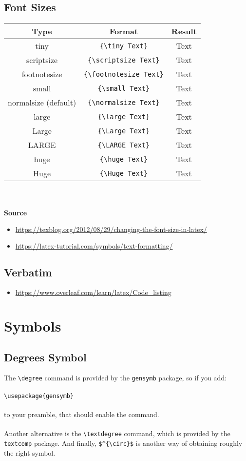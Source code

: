 \documentclass[10pt, letterpaper]{article}
\begin{document}
\subsection{Font Sizes}
\begin{tabular}{c c c}
    Type & Format & Result\\
    \hline
    tiny & \verb|{\tiny Text}| & {\tiny Text}\\
    scriptsize & \verb|{\scriptsize Text}| & {\scriptsize Text}\\
    footnotesize & \verb|{\footnotesize Text}| & {\footnotesize Text}\\
    small & \verb|{\small Text}| & {\small Text}\\
    normalsize (default) & \verb|{\normalsize Text}| & {\normalsize Text}\\
    large & \verb|{\large Text}| & {\large Text}\\
    Large & \verb|{\Large Text}| & {\Large Text}\\
    LARGE & \verb|{\LARGE Text}| & {\LARGE Text}\\
    huge & \verb|{\huge Text}| & {\huge Text}\\
    Huge & \verb|{\Huge Text}| & {\Huge Text}\\
\end{tabular}\\
\\
\textbf{Source}
\begin{itemize}
  \item \url{https://texblog.org/2012/08/29/changing-the-font-size-in-latex/}
  \item \url{https://latex-tutorial.com/symbols/text-formatting/}
\end{itemize}

\subsection{Verbatim}
\begin{itemize}
  \item \url{https://www.overleaf.com/learn/latex/Code_listing}
\end{itemize}


\section{Symbols}
\subsection{Degrees Symbol}
The \verb|\degree| command is provided by the \verb|gensymb| package, so if you add:\\
\\
\verb|\usepackage{gensymb}|\\
\\
to your preamble, that should enable the command.\\
\\
Another alternative is the \verb|\textdegree| command, which is provided by the \verb|textcomp| package. And finally, \verb|$^{\circ}$| is another way of obtaining roughly the right symbol.
\end{document}
